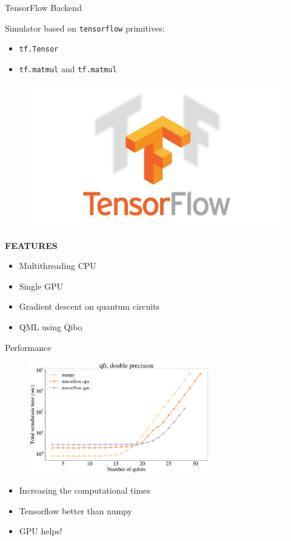 \documentclass[11p,aspectratio=169]{beamer}
\begin{document}
\begin{frame}{TensorFlow Backend}

    \begin{multicols*}{2}
        Simulator based on \texttt{tensorflow} primitives:
    \begin{itemize}
        \item \texttt{tf.Tensor}
        \item  \texttt{tf.matmul} and \texttt{tf.matmul}
    \end{itemize}
    \begin{figure}
        \includegraphics[width=0.3 \textwidth]{figures/tensorflow.jpg}
    \end{figure}
    \end{multicols*}
    

    \textbf{FEATURES}
    \begin{multicols*}{2}
        \begin{itemize}
            \item Multithreading CPU
            \item Single GPU
            \item Gradient descent on quantum circuits
            \item QML using Qibo
        \end{itemize}
    \end{multicols*}
    
\end{frame}

\begin{frame}{Performance}
    \begin{figure}
        \centering
        \includegraphics[width=0.7\textwidth]{figures/np_tf_double.pdf}
    \end{figure}

    \begin{multicols*}{2}
        \begin{itemize}        
        \item Increasing the computational times
        \item Tensorflow better than numpy
        \item GPU helps!
    \end{itemize}
    \end{multicols*}

\end{frame}
\end{document}
